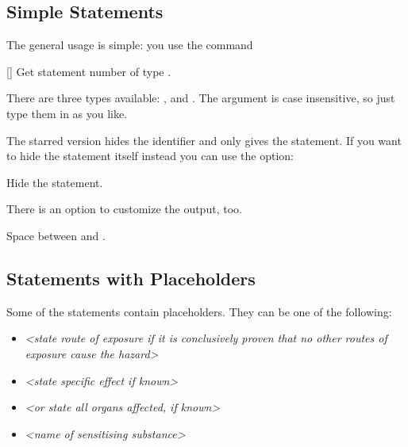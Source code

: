 \documentclass[load-preamble+]{cnltx-doc}
\begin{document}
\subsection{Simple Statements}
The general usage is simple: you use the command
\begin{commands}
  [\sarg{}]
    Get statement number  of type .
\end{commands}
There are three types available: ,  and .  The
 argument is case insensitive, so just type them in as you like.
\begin{example}
   \par
   \par
   \par
   \par
\end{example}

The starred version hides the identifier and only gives the statement.  If you
want to hide the statement itself instead you can use the option:
\begin{options}
    Hide the statement.
\end{options}

There is an option to customize the output, too.
\begin{options}
  \Default
    Space between  and .
\end{options}
\begin{example}
   \par
   \par
   \par
\end{example}

\subsection{Statements with Placeholders}
Some of the statements contain placeholders.  They can be one of the
following:
\begin{itemize}
  \item \textit{\textless state route of exposure if it is conclusively proven
      that no other routes of exposure cause the hazard\textgreater}
  \item \textit{\textless state specific effect if known\textgreater}
  \item \textit{\textless or state all organs affected, if known\textgreater}
  \item \textit{\textless name of sensitising substance\textgreater}
\end{itemize}
\end{document}
